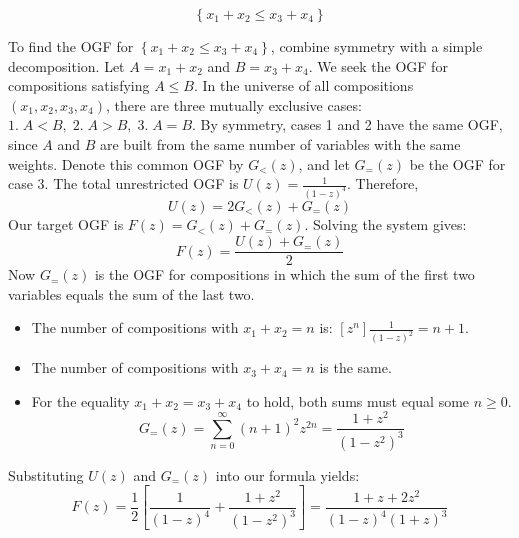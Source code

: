 \partsep
{}
\begin{equation*}
    \left\{x_{1} + x_{2}\leq x_{3} + x_{4}\right\}
\end{equation*}

To find the OGF for $\left\{x_{1} + x_{2}\leq x_{3} + x_{4}\right\}$, combine symmetry with a simple decomposition. Let $A = x_{1} + x_{2}$ and $B = x_{3} + x_{4}$.
We seek the OGF for compositions satisfying $A\leq B$. In the universe of all compositions
$(x_{1}, x_{2}, x_{3}, x_{4})$, there are three mutually exclusive cases:
$1.\; A < B,\; 2.\; A > B,\; 3.\; A = B$. By symmetry, cases 1 and 2 have the same OGF,
since $A$ and $B$ are built from the same number of variables with the same weights.
Denote this common OGF by $G_{<}(z)$, and let $G_{=}(z)$ be the OGF for case 3.
The total unrestricted OGF is $U(z) = \frac{1}{(1 - z)^{4}}$. Therefore,
\begin{equation*}
    U(z) = 2G_{<}(z) + G_{=}(z)
\end{equation*}
Our target OGF is $F(z) = G_{<}(z) + G_{=}(z)$. Solving the system gives:
\begin{equation*}
    F(z) = \frac{U(z) + G_{=}(z)}{2}
\end{equation*}
Now $G_{=}(z)$ is the OGF for compositions in which the sum of the first two variables equals
the sum of the last two.
\begin{itemize}
    \item The number of compositions with $x_{1} + x_{2} = n$ is:
        $[z^{n}] \frac{1}{(1 - z)^{2}} = n + 1$.
    \item The number of compositions with $x_{3} + x_{4} = n$ is the same.
    \item For the equality $x_{1} + x_{2} = x_{3} + x_{4}$ to hold, both sums must equal some $n\geq 0$.
        \begin{equation*}
            G_{=}(z) = \sum_{n = 0}^{\infty}(n + 1)^{2}z^{2n} = \frac{1 + z^{2}}{(1 - z^{2})^{3}}
        \end{equation*}
\end{itemize}
Substituting $U(z)$ and $G_{=}(z)$ into our formula yields:
\begin{equation*}
    F(z) = \frac{1}{2} \left[\frac{1}{(1 - z)^{4}} + \frac{1 + z^{2}}{(1 - z^{2})^{3}}\right] = \frac{1 + z + 2z^{2}}{(1 - z)^{4}(1 + z)^{3}}
\end{equation*}

